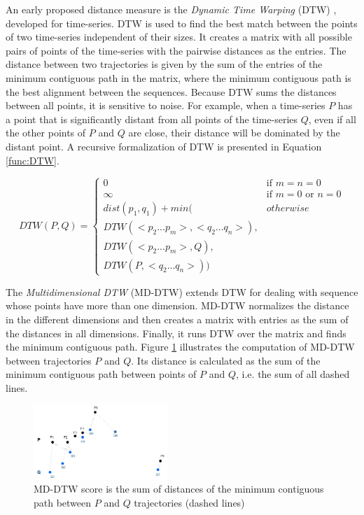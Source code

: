 An early proposed distance measure is the \emph{Dynamic Time Warping} (DTW) \cite{berndt1994using}, developed for time-series. DTW is used to find the best match between the points of two time-series independent of their sizes. It creates a matrix with all possible pairs of points of the time-series with the pairwise distances as the entries.
The distance between two trajectories is given by the sum of the entries of the minimum contiguous path in the matrix, where the minimum contiguous path is the best alignment between the sequences. Because DTW sums the distances between all points, it is sensitive to noise. For example, when a time-series $P$ has a point that is significantly distant from all points of the time-series $Q$, even if all the other points of $P$ and $Q$ are close, their distance will be dominated by the distant point. A recursive formalization of DTW is presented in Equation \ref{func:DTW}.

\begin{equation}
\label{func:DTW}
  DTW(P, Q) = 
    \begin{cases} 
        0 & \text{if } m = n = 0\\ 
      \infty & \text{if } m = 0 \text{ or } n = 0\\ 
      dist(p_1, q_1) + min( & otherwise\\
      DTW(<p_2...p_m>,<q_2...q_n>),\\
      DTW(<p_2...p_m>, Q), \\
      DTW(P, <q_2...q_n>)) &
    \end{cases}
\end{equation}

The \emph{Multidimensional DTW} (MD-DTW) \cite{ten2007multi} extends DTW for dealing with sequence whose points have more than one dimension. MD-DTW normalizes the distance in the different dimensions and then creates a matrix with entries as the sum of the distances in all dimensions. Finally, it runs DTW over the matrix and finds the minimum contiguous path. Figure \ref{fig:related_trajes_DTW} illustrates the computation of MD-DTW between trajectories $P$ and $Q$. Its distance is calculated as the sum of the minimum contiguous path between points of $P$ and $Q$, i.e. the sum of all dashed lines.

\begin{figure}[ht]
\centering
\includegraphics[width=0.45\textwidth]{Related_Works/related_trajes-DTW.jpg}
\caption{\label{fig:related_trajes_DTW}MD-DTW score is the sum of distances of the minimum contiguous path between $P$ and $Q$ trajectories (dashed lines)}
\end{figure}

